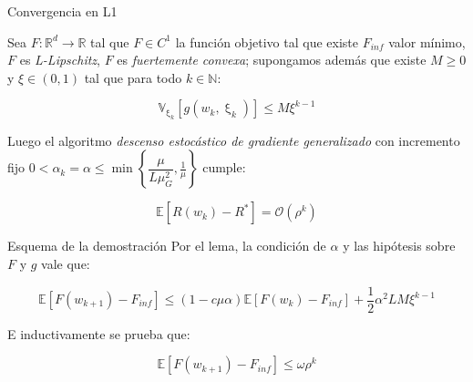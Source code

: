 \documentclass{beamer}
\newcommand{\R}{{\mathbb{R}}}
\newcommand{\N}{{\mathbb{N}}}
\newcommand{\sett}[1]{\left\lbrace#1\right\rbrace}
\newcommand{\expectation}[1]{\mathbb{E} \left[#1\right]}
\newcommand{\variancesub}[2]{\mathbb{V}_{#1} \left[#2\right]}
\newcommand{\variancechik}[1]{\variancesub{\upxi_{k}}{#1}}
\begin{document}
\begin{frame}{Convergencia en L1}
\begin{theorem}
	Sea $F: \R^d \rightarrow \R$ tal que $F \in C^1$ la funci\'on objetivo tal que existe $F_{inf}$ valor m\'inimo, $F$ es \textit{L-Lipschitz}, $F$ es \textit{fuertemente convexa}; supongamos adem\'as que existe $M \geq 0$ y $\xi \in (0,1)$ tal que para todo $k \in \N$:
	
	\begin{equation*}
	\variancechik{g(w_k, \upxi_{k})} \leq M \xi^{k-1}
	\end{equation*}
	
	Luego el algoritmo \textit{descenso estoc\'astico de gradiente generalizado} con incremento fijo $0  < \alpha_k = \alpha \leq \min\sett{\dfrac{\mu}{L \mu_G^2}, \frac{1}{ \mu}} $ cumple:
	
	\begin{equation*}
	\expectation{R(w_k) - R^*} = \mathcal{O} \left(\rho^{k}\right)
	\end{equation*}
	
\end{theorem}
\end{frame}

\begin{frame}{Esquema de la demostraci\'on}
	Por el lema, la condici\'on de $\alpha$ y las hip\'otesis sobre $F$ y $g$ vale que:
	
\begin{equation*}
\expectation{F(w_{k+1}) - F_{inf}} \leq \left(1 - c \mu \alpha\right) \expectation{F(w_k) - F_{inf}} + \frac{1}{2} \alpha^2 LM \xi^{k-1}
\end{equation*}

E inductivamente se prueba que:

\begin{equation*}
\expectation{F(w_{k+1}) - F_{inf}}  \leq  \omega \rho^{k}
\end{equation*}
\end{frame}
\end{document}
